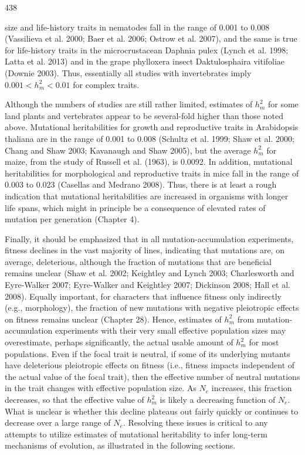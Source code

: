 \documentclass{article}
\begin{document}
438

size and life-history traits in nematodes fall in the range of 0.001 to 0.008 (Vassilieva et al. 2000; Baer et al. 2006; Ostrow et al. 2007), and the same is true for life-history traits in the microcrustacean Daphnia pulex (Lynch et al. 1998; Latta et al. 2013) and in the grape phylloxera insect Daktulosphaira vitifoliae (Downie 2003). Thus, essentially all studies with invertebrates imply  $ 0.001 < h_{m}^{2} < 0.01 $ for complex traits.

Although the numbers of studies are still rather limited, estimates of  $ h_m^2 $ for some land plants and vertebrates appear to be several-fold higher than those noted above. Mutational heritabilities for growth and reproductive traits in Arabidopsis thaliana are in the range of 0.001 to 0.008 (Schultz et al. 1999; Shaw et al. 2000; Chang and Shaw 2003; Kavanaugh and Shaw 2005), but the average  $ h_m^2 $ for maize, from the study of Russell et al. (1963), is 0.0092. In addition, mutational heritabilities for morphological and reproductive traits in mice fall in the range of 0.003 to 0.023 (Casellas and Medrano 2008). Thus, there is at least a rough indication that mutational heritabilities are increased in organisms with longer life spans, which might in principle be a consequence of elevated rates of mutation per generation (Chapter 4).

Finally, it should be emphasized that in all mutation-accumulation experiments, fitness declines in the vast majority of lines, indicating that mutations are, on average, deleterious, although the fraction of mutations that are beneficial remains unclear (Shaw et al. 2002; Keightley and Lynch 2003; Charlesworth and Eyre-Walker 2007; Eyre-Walker and Keightley 2007; Dickinson 2008; Hall et al. 2008). Equally important, for characters that influence fitness only indirectly (e.g., morphology), the fraction of new mutations with negative pleiotropic effects on fitness remains unclear (Chapter 28). Hence, estimates of  $ h_{m}^{2} $ from mutation-accumulation experiments with their very small effective population sizes may overestimate, perhaps significantly, the actual usable amount of  $ h_{m}^{2} $ for most populations. Even if the focal trait is neutral, if some of its underlying mutants have deleterious pleiotropic effects on fitness (i.e., fitness impacts independent of the actual value of the focal trait), then the effective number of neutral mutations in the trait changes with effective population size. As  $ N_{e} $ increases, this fraction decreases, so that the effective value of  $ h_{m}^{2} $ is likely a decreasing function of  $ N_{e} $. What is unclear is whether this decline plateaus out fairly quickly or continues to decrease over a large range of  $ N_{e} $. Resolving these issues is critical to any attempts to utilize estimates of mutational heritability to infer long-term mechanisms of evolution, as illustrated in the following sections.
\end{document}
